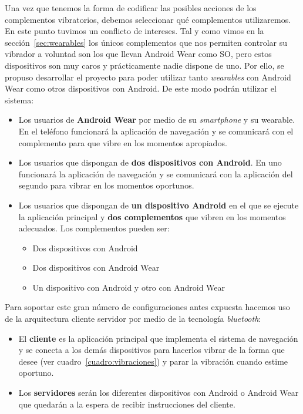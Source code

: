 Una vez que tenemos la forma de codificar las posibles acciones de los complementos vibratorios,
debemos seleccionar qué complementos utilizaremos. En este punto tuvimos un conflicto de
intereses. Tal y como vimos en la sección~\ref{sec:wearables} los únicos complementos que nos
permiten controlar su vibrador a voluntad son los que llevan Android Wear como \acs{SO}, pero estos
dispositivos son muy caros y prácticamente nadie dispone de uno. Por ello, se propuso desarrollar el
proyecto para poder utilizar tanto \emph{wearables} con Android Wear como otros dispositivos con
Android. De este modo podrán utilizar el sistema:

\begin{itemize}
  \item Los usuarios de \textbf{Android Wear} por medio de su \emph{smartphone} y su {wearable}. En
    el teléfono funcionará la aplicación de navegación y se comunicará con el complemento para que
    vibre en los momentos apropiados.

  \item Los usuarios que dispongan de \textbf{dos dispositivos con Android}. En uno funcionará la
    aplicación de navegación y se comunicará con la aplicación del segundo para vibrar en los
    momentos oportunos.

  \item Los usuarios que dispongan de \textbf{un dispositivo Android} en el que se ejecute la
    aplicación principal y \textbf{dos complementos} que vibren en los momentos adecuados. Los
    complementos pueden ser:

    \begin{itemize}
      \item Dos dispositivos con Android
      \item Dos dispositivos con Android Wear
      \item Un dispositivo con Android y otro con Android Wear
    \end{itemize}
\end{itemize}

Para soportar este gran número de configuraciones antes expuesta hacemos uso de la arquitectura
cliente servidor por medio de la tecnología \emph{bluetooth}:

\begin{itemize}
  \item El \textbf{cliente} es la aplicación principal que implementa el sistema de navegación y se
    conecta a los demás dispositivos para hacerlos vibrar de la forma que desee (ver
    cuadro~\ref{cuadro:vibraciones}) y parar la vibración cuando estime oportuno.
  \item Los \textbf{servidores} serán los diferentes dispositivos con Android o Android Wear que
    quedarán a la espera de recibir instrucciones del cliente.
\end{itemize}

